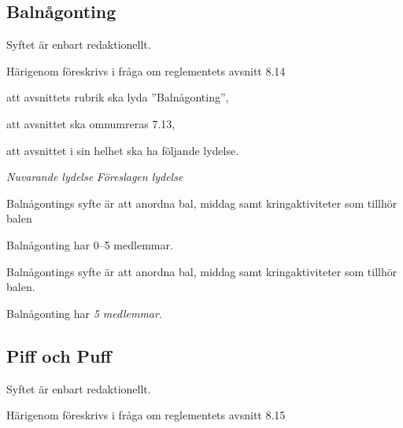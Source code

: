\documentclass{article}
\newenvironment{lydelse}
    {\begin{paracol}{2}%
        \emph{Nuvarande lydelse}%
        \switchcolumn%
        \emph{Föreslagen lydelse}%
    \end{paracol}%
    \begin{enumerate}[label=\thesubsection.\arabic*]%
    \begin{paracol}{2}%
    }{\end{paracol}\end{enumerate}}
\begin{document}
\subsection{Balnågonting}
Syftet är enbart redaktionellt.

Härigenom föreskrivs i fråga om reglementets avsnitt 8.14

\begin{dels}
    \item att avsnittets rubrik ska lyda ''Balnågonting'',
    \item att avsnittet ska omnumreras 7.13,
    \item att avsnittet i sin helhet ska ha följande lydelse.
\end{dels}
\begin{lydelse}
    \setcounter{section}{8}
    \setcounter{subsection}{14}
    
    \item Balnågontings syfte är att anordna bal, middag samt kringaktiviteter som tillhör balen

	\item Balnågonting har 0--5 medlemmar.
    
    \setcounter{section}{7}
    \setcounter{subsection}{13}
    \switchcolumn
    
    \item Balnågontings syfte är att anordna bal, middag samt kringaktiviteter som tillhör balen.

    \item Balnågonting har \emph{5 medlemmar}.
    
\end{lydelse}

\subsection{Piff och Puff}
Syftet är enbart redaktionellt.

Härigenom föreskrivs i fråga om reglementets avsnitt 8.15
\end{document}
